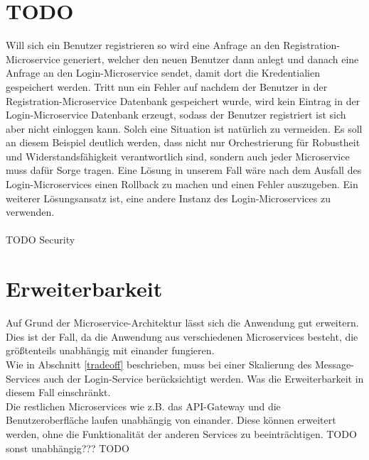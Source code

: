 \section{TODO}
Will sich ein Benutzer registrieren so wird eine Anfrage an den Registration-Microservice generiert, welcher den neuen Benutzer dann anlegt und danach eine Anfrage an den Login-Microservice sendet, damit dort die Kredentialien gespeichert werden. Tritt nun ein Fehler auf nachdem der Benutzer in der Registration-Microservice Datenbank gespeichert wurde, wird kein Eintrag in der Login-Microservice Datenbank erzeugt, sodass der Benutzer registriert ist sich aber nicht einloggen kann. Solch eine Situation ist natürlich zu vermeiden. Es soll an diesem Beispiel deutlich werden, dass nicht nur Orchestrierung für Robustheit und Widerstandsfähigkeit verantwortlich sind, sondern auch jeder Microservice muss dafür Sorge tragen. Eine Lösung in unserem Fall wäre nach dem Ausfall des Login-Microservices einen Rollback zu machen und einen Fehler auszugeben. Ein weiterer Lösungsansatz ist, eine andere Instanz des Login-Microservices zu verwenden.\\
\\
TODO Security

\section{Erweiterbarkeit}
Auf Grund der Microservice-Architektur lässt sich die Anwendung gut erweitern. Dies ist der Fall, da die Anwendung aus verschiedenen Microservices besteht, die größtenteils unabhängig mit einander fungieren.\\
Wie in Abschnitt \ref{tradeoff} beschrieben, muss bei einer Skalierung des Message-Services auch der Login-Service berücksichtigt werden. Was die Erweiterbarkeit in diesem Fall einschränkt.\\
Die restlichen Microservices wie z.B. das API-Gateway und die Benutzeroberfläche laufen unabhängig von einander. Diese können erweitert werden, ohne die Funktionalität der anderen Services zu beeinträchtigen.
TODO sonst unabhängig??? TODO